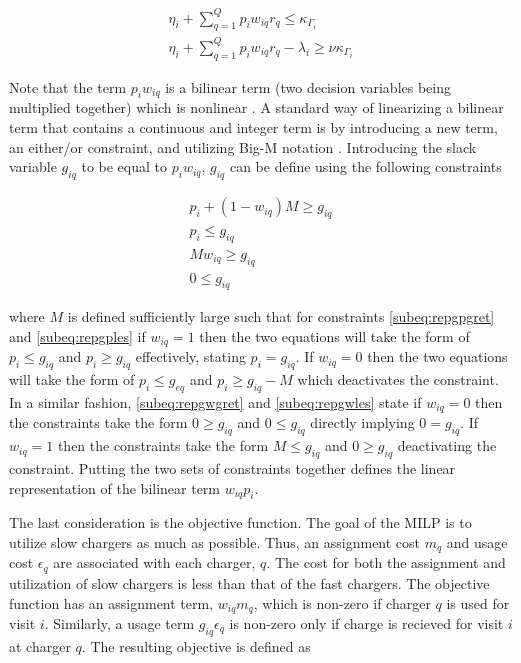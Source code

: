 \documentclass[letterpaper, 10pt, conference]{IEEEtran}
\begin{document}
\begin{subequations}
\begin{align}
    \eta_i + \sum_{q=1}^Q p_i w_{iq} r_q \leq \kappa_{\Gamma_i}                 \\
    \eta_i + \sum_{q=1}^Q p_i w_{iq} r_q - \lambda_i \geq \nu \kappa_{\Gamma_i}
\end{align}
\end{subequations}

Note that the term $p_i w_{iq}$ is a bilinear term (two decision variables being multiplied together) which is nonlinear \cite{Rodriguez2013}. A standard way of linearizing a bilinear term that contains a continuous and integer term is by introducing a new term, an either/or constraint, and utilizing Big-M notation \cite{Chen2010,Rodriguez2013}. Introducing the slack variable $g_{iq}$ to be equal to $p_i w_{iq}$, $g_{iq}$ can be define using the following constraints

\begin{subequations}
\begin{align}
    p_i + (1 - w_{iq})M \geq g_{iq}  \label{subeq:repgpgret} \\
    p_i \leq g_{iq}                 \label{subeq:repgples} \\
    Mw_{iq} \geq g_{iq}              \label{subeq:repgwgret} \\
    0 \leq g_{iq}                   \label{subeq:repgwles}
\end{align}
\end{subequations}

\noindent
where $M$ is defined sufficiently large such that for constraints \eqref{subeq:repgpgret} and \eqref{subeq:repgples} if $w_{iq} = 1$ then the two equations will take the form of $p_i \leq g_{iq}$ and $p_i \geq g_{iq}$ effectively, stating $p_i = g_{iq}$. If $w_{iq} = 0$ then the two equations will take the form of $p_i \leq g_{eq}$ and $p_i \geq g_{iq} - M$ which deactivates the constraint. In a similar fashion, \eqref{subeq:repgwgret} and \eqref{subeq:repgwles} state if $w_{iq} = 0$ then the constraints take the form $0 \geq g_{iq}$ and $0 \leq g_{iq}$ directly implying $0 = g_{iq}$. If $w_{iq} = 1$ then the constraints take the form $M \leq g_{iq}$ and $0 \geq g_{iq}$ deactivating the constraint. Putting the two sets of constraints together defines the linear representation of the bilinear term $w_{iq} p_i$.

The last consideration is the objective function. The goal of the MILP is to utilize slow chargers as much as possible. Thus, an assignment cost $m_q$ and usage cost $\epsilon_q$ are associated with each charger, $q$. The cost for both the assignment and utilization of slow chargers is less than that of the fast chargers. The objective function has an assignment term, $w_{iq}m_q$, which is non-zero if charger $q$ is used for visit $i$. Similarly, a usage term $g_{iq} \epsilon_q$ is non-zero only if charge is recieved for visit $i$ at charger $q$. The resulting objective is defined as
\end{document}
